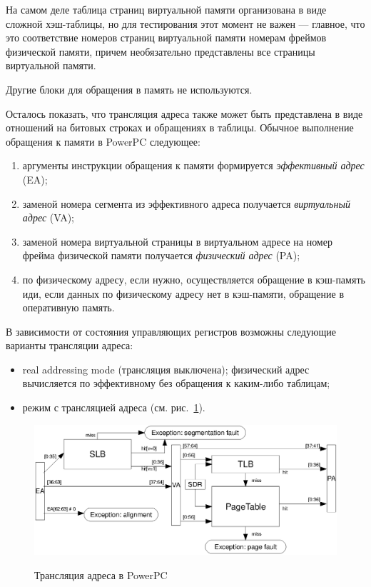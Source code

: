 \documentclass[14pt]{extreport}
\begin{document}
На самом деле таблица страниц виртуальной памяти организована в виде сложной
хэш-таблицы, но для тестирования этот момент не важен --- главное, что это
соответствие номеров страниц виртуальной памяти номерам фреймов физической
памяти, причем необязательно представлены все страницы виртуальной памяти.

Другие блоки для обращения в память не используются.

Осталось показать, что трансляция адреса также может быть представлена в виде
отношений на битовых строках и обращениях в таблицы. Обычное выполнение
обращения к памяти в PowerPC следующее:
\begin{enumerate}
    \item аргументы инструкции обращения к памяти формируется \emph{эффективный
адрес} (EA);
    \item заменой номера сегмента из эффективного адреса получается
\emph{виртуальный адрес} (VA);
    \item заменой номера виртуальной страницы в виртуальном адресе на номер
фрейма физической памяти получается \emph{физический адрес} (PA);
    \item по физическому адресу, если нужно, осуществляется обращение в
кэш-память иди, если данных по физическому адресу нет в кэш-памяти, обращение в
оперативную память.
\end{enumerate}

В зависимости от состояния управляющих регистров возможны следующие варианты
трансляции адреса:
\begin{itemize}
  \item real addressing mode (трансляция выключена); физический адрес
вычисляется по эффективному без обращения к каким-либо таблицам;
  \item режим с трансляцией адреса (см. рис.~\ref{fig:ppc_address_translation}).
\end{itemize}

\begin{figure}[h] \center
  \includegraphics[width=\textwidth]{4.analysis/ppc_addrtrans}\\
  \caption{Трансляция адреса в PowerPC}\label{fig:ppc_address_translation}
\end{figure}
\end{document}
